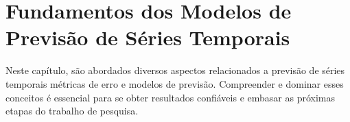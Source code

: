 \section{Fundamentos dos Modelos de Previsão de S\'eries Temporais}\label{sec:base}

 Neste capítulo, são abordados diversos aspectos relacionados a previsão de séries temporais métricas de erro e modelos de previsão. Compreender e dominar esses conceitos é essencial para se obter resultados confiáveis e embasar as próximas etapas do trabalho de pesquisa.











